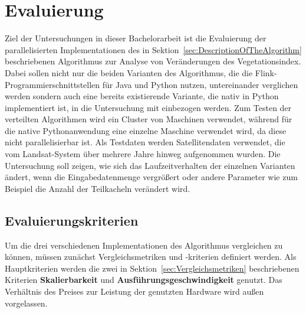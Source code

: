 
\chapter{Evaluierung}
Ziel der Untersuchungen in dieser Bachelorarbeit ist die Evaluierung der parallelisierten Implementationen des in Sektion~\ref{sec:DescriptionOfTheAlgorithm} beschriebenen Algorithmus zur Analyse von Veränderungen des Vegetationsindex. Dabei sollen nicht nur die beiden Varianten des Algorithmus, die die Flink-Programmierschnittstellen für Java und Python nutzen, untereinander verglichen werden sondern auch eine bereits existierende Variante, die nativ in Python implementiert ist, in die Untersuchung mit einbezogen werden. Zum Testen der verteilten Algorithmen wird ein Cluster von Maschinen verwendet, während für die native Pythonanwendung eine einzelne Maschine verwendet wird, da diese nicht parallelisierbar ist. Als Testdaten werden Satellitendaten verwendet, die vom Landsat-System über mehrere Jahre hinweg aufgenommen wurden. Die Untersuchung soll zeigen, wie sich das Laufzeitverhalten der einzelnen Varianten ändert, wenn die Eingabedatenmenge vergrößert oder andere Parameter wie zum Beispiel die Anzahl der Teilkacheln verändert wird.

\section{Evaluierungskriterien}
\label{sec:evaluationCriteria}
Um die drei verschiedenen Implementationen des Algorithmus vergleichen zu können, müssen zunächst Vergleichsmetriken und -kriterien definiert werden. Als Hauptkriterien werden die zwei in Sektion~\ref{sec:Vergleichsmetriken} beschriebenen Kriterien \textbf{Skalierbarkeit} und \textbf{Ausführungsgeschwindigkeit} genutzt. Das Verhältnis des Preises zur Leistung der genutzten Hardware wird außen vorgelassen. 

